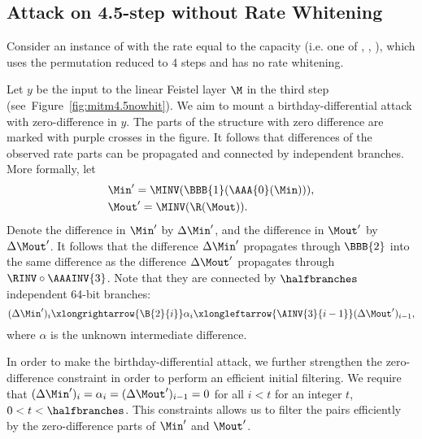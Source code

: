 \subsection{Attack on 4.5-step \aead{} without Rate Whitening}

Consider an instance of \aead{} with the rate equal to the capacity (i.e. one of 
,
,
),
which uses the \aCipher{} permutation reduced to 4 steps and has no rate whitening.

Let $y$ be the input to the linear Feistel layer $\M$ in the third step (see~Figure~\ref{fig:mitm4.5nowhit}). We aim to mount a birthday-differential attack with zero-difference in $y$. The parts of the structure with zero difference are marked with purple crosses in the figure. It follows that differences of the observed rate parts can be propagated and connected by independent branches. More formally, let
\begin{align*}
    &\Min' = \MINV (\BBB{1} (\AAA{0} (\Min))),\\
    &\Mout' = \MINV(\R(\Mout)).
\end{align*}
Denote the difference in $\Min'$ by $\Delta\Min'$, and the difference in $\Mout'$ by $\Delta\Mout'$.
It follows that the difference $\Delta\Min'$ propagates through $\BBB{2}$ into the same difference as the difference $\Delta\Mout'$ propagates through $\RINV \circ \AAAINV{3}$. Note that they are connected by $\halfbranches$ independent 64-bit branches:
\begin{equation}
\label{eq:mitm-4.5steps-nowhitening}
(\Delta\Min')_i
\xlongrightarrow{\B{2}{i}} \alpha_i
\xlongleftarrow{\AINV{3}{i-1}}
(\Delta\Mout')_{i-1},
\end{equation}
where $\alpha$ is the unknown intermediate difference.

{}

In order to make the birthday-differential attack, we further strengthen the zero-difference constraint in order to perform an efficient initial filtering. We require that $(\Delta\Min')_i = \alpha_i = (\Delta\Mout')_{i-1} = 0$ for all $i < t$ for an integer $t$, $0 < t < \halfbranches$. This constraints allows us to filter the pairs efficiently by the zero-difference parts of $\Min'$ and $\Mout'$.

